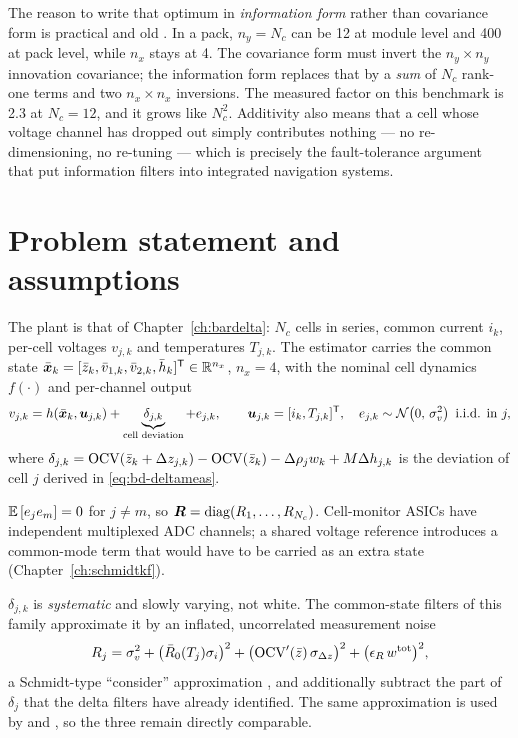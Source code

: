 The reason to write that optimum in \emph{information form} rather than covariance form is
practical and old \cite{mutambara1998,grime1994decentralized,rao1993decentralized}. In a pack,
$n_y=N_c$ can be 12 at module level and 400 at pack level, while $n_x$ stays at 4. The covariance
form must invert the $n_y\times n_y$ innovation covariance; the information form replaces that by
a \emph{sum} of $N_c$ rank-one terms and two $n_x\times n_x$ inversions. The measured factor on
this benchmark is \num{2.3} at $N_c=12$, and it grows like $N_c^2$. Additivity also means that a
cell whose voltage channel has dropped out simply contributes nothing --- no re-dimensioning, no
re-tuning --- which is precisely the fault-tolerance argument that put information filters into
integrated navigation systems.

\section{Problem statement and assumptions}
The plant is that of Chapter~\ref{ch:bardelta}: $N_c$ cells in series, common current $i_k$,
per-cell voltages $v_{j,k}$ and temperatures $T_{j,k}$. The estimator carries the common state
$\bar{\bm{x}}_k = [\bar{z}_k,\bar v_{1,k},\bar v_{2,k},\bar h_k]^{\mathsf{T}}\in\mathbb{R}^{n_x}$, $n_x=4$, with
the nominal cell dynamics $f(\cdot)$ and per-channel output
\begin{equation}
v_{j,k} = h(\bar{\vx}_k,\vu_{j,k}) + \underbrace{\delta_{j,k}}_{\text{cell deviation}} + e_{j,k},
\qquad \vu_{j,k}=[i_k,T_{j,k}]^\T,\quad e_{j,k}\sim\N{0}{\sigma_v^2}\ \text{i.i.d. in }j,
\label{eq:if-meas}
\end{equation}
where $\delta_{j,k} = \mathrm{OCV}(\bar{z}_k+\Delta z_{j,k}) - \mathrm{OCV}(\bar{z}_k) - \Delta\rho_j w_k +
M\Delta h_{j,k}$ is the deviation of cell $j$ derived in \eqref{eq:bd-deltameas}.

\begin{assumption}\label{as:if-indep}
$\mathbb{E}\left[e_{j}e_{m}\right]=0$ for $j\neq m$, so $\bm{R}=\operatorname{diag}(R_1,\dots,R_{N_c})$. Cell-monitor ASICs have
independent multiplexed ADC channels; a shared voltage reference introduces a common-mode term
that would have to be carried as an extra state (Chapter~\ref{ch:schmidtkf}).
\end{assumption}
\begin{assumption}\label{as:if-consider}
$\delta_{j,k}$ is \emph{systematic} and slowly varying, not white. The common-state filters of
this family approximate it by an inflated, uncorrelated measurement noise
\begin{equation}
R_j = \sigma_v^2 + \big(\bar R_0(T_j)\sigma_i\big)^2
      + \big(\mathrm{OCV}'(\bar{z})\,\sigma_{\Delta z}\big)^2 + \big(\epsilon_R\,w^{\mathrm{tot}}\big)^2 ,
\label{eq:if-Rj}
\end{equation}
a Schmidt-type ``consider'' approximation \cite{schmidt1966}, and additionally subtract the part of
$\delta_{j}$ that the delta filters have already identified. The same approximation is used by
 and , so the three remain directly comparable.
\end{assumption}

